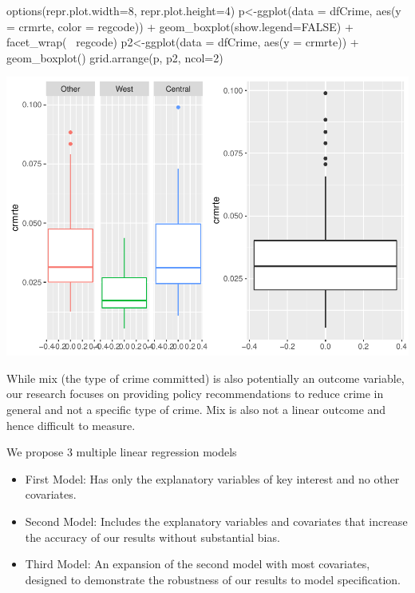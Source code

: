 \documentclass[]{article}
\newenvironment{Shaded}{}{}
\newcommand{\DataTypeTok}[1]{#1}
\newcommand{\DecValTok}[1]{#1}
\newcommand{\KeywordTok}[1]{\textcolor[rgb]{0.00,0.00,1.00}{#1}}
\newcommand{\NormalTok}[1]{#1}
\newcommand{\OperatorTok}[1]{#1}
\newcommand{\OtherTok}[1]{\textcolor[rgb]{1.00,0.25,0.00}{#1}}
\newcommand{\StringTok}[1]{\textcolor[rgb]{0.00,0.50,0.50}{#1}}
\begin{document}
\begin{Shaded}
\begin{Highlighting}[]
\KeywordTok{options}\NormalTok{(}\DataTypeTok{repr.plot.width=}\DecValTok{8}\NormalTok{, }\DataTypeTok{repr.plot.height=}\DecValTok{4}\NormalTok{)}
\NormalTok{p<-}\KeywordTok{ggplot}\NormalTok{(}\DataTypeTok{data =}\NormalTok{ dfCrime, }\KeywordTok{aes}\NormalTok{(}\DataTypeTok{y =}\NormalTok{ crmrte, }\DataTypeTok{color =}\NormalTok{ regcode)) }\OperatorTok{+}
\StringTok{     }\KeywordTok{geom_boxplot}\NormalTok{(}\DataTypeTok{show.legend=}\OtherTok{FALSE}\NormalTok{) }\OperatorTok{+}\StringTok{ }\KeywordTok{facet_wrap}\NormalTok{(}\OperatorTok{~}\StringTok{ }\NormalTok{regcode)}
\NormalTok{p2<-}\KeywordTok{ggplot}\NormalTok{(}\DataTypeTok{data =}\NormalTok{ dfCrime, }\KeywordTok{aes}\NormalTok{(}\DataTypeTok{y =}\NormalTok{ crmrte)) }\OperatorTok{+}
\StringTok{     }\KeywordTok{geom_boxplot}\NormalTok{()}
\KeywordTok{grid.arrange}\NormalTok{(p, p2, }\DataTypeTok{ncol=}\DecValTok{2}\NormalTok{)}
\end{Highlighting}
\end{Shaded}

\includegraphics{Bagnard_Gaustad_Hartman_Leung_Lab_3_files/figure-latex/unnamed-chunk-47-1.pdf}

While mix (the type of crime committed) is also potentially an outcome
variable, our research focuses on providing policy recommendations to
reduce crime in general and not a specific type of crime. Mix is also
not a linear outcome and hence difficult to measure.

We propose 3 multiple linear regression models

\begin{itemize}
\item
  First Model: Has only the explanatory variables of key interest and no
  other covariates.
\item
  Second Model: Includes the explanatory variables and covariates that
  increase the accuracy of our results without substantial bias.
\item
  Third Model: An expansion of the second model with most covariates,
  designed to demonstrate the robustness of our results to model
  specification.
\end{itemize}
\end{document}
